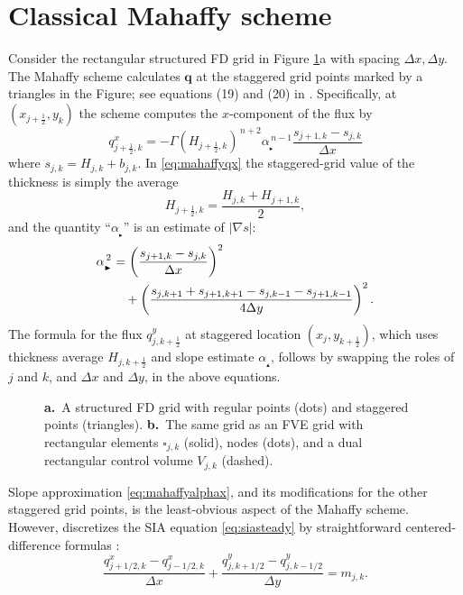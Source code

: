 \documentclass[twocolumn,letterpaper]{igs}
\newcommand\bq{\mathbf{q}}
\newcommand{\grad}{\nabla}
\newcommand\alpharight{\alpha_{{}_{\blacktriangleright}}}
\newcommand\alphaup{\alpha_{{\!}_{\blacktriangle}}}
\newcommand{\half}{\tfrac{1}{2}}
\begin{document}
\section{Classical Mahaffy scheme}   \label{sec:mahaffyfd}

Consider the rectangular structured FD grid in Figure \ref{fig:fdfemgrids}a with spacing $\Delta x,\Delta y$.  The Mahaffy scheme calculates $\bq$ at the staggered grid points marked by a triangles in the Figure; see equations (19) and (20) in \cite{Mahaffy1976}.  Specifically, at $(x_{j+\half},y_k)$ the scheme computes the $x$-component of the flux by
\begin{equation}
q^x_{j+\half,k} = - \Gamma (H_{j+\half,k})^{\,n+2} \alpharight^{\,n-1} \frac{s_{j+1,k} - s_{j,k}}{\Delta x}  \label{eq:mahaffyqx}
\end{equation}
where $s_{j,k} = H_{j,k} + b_{j,k}$.  In \eqref{eq:mahaffyqx} the staggered-grid value of the thickness is simply the average
\begin{equation}
  H_{j+\half,k} = \frac{H_{j,k} + H_{j+1,k}}{2},  \label{eq:mahaffyHav}
\end{equation}
and the quantity ``$\alpharight$\!'' is an estimate of $|\grad s|$:
\begin{align}
\alpharight^{\,2} &= \left(\frac{s_{j+1,k} - s_{j,k}}{\Delta x}\right)^2  \label{eq:mahaffyalphax} \\
  &\quad + \left(\frac{s_{j,k+1} + s_{j+1,k+1} - s_{j,k-1} - s_{j+1,k-1}}{4 \Delta y}\right)^2. \notag
\end{align}
The formula for the flux $q^y_{j,k+\half}$ at staggered location $(x_j,y_{k+\half})$, which uses thickness average $H_{j,k+\half}$ and slope estimate $\alphaup$, follows by swapping the roles of $j$ and $k$, and $\Delta x$ and $\Delta y$, in the above equations.

\begin{figure}[ht]
\begin{center}
 \quad 
\end{center}
\caption{\textbf{a.}~A structured FD grid with regular points (dots) and staggered points (triangles).  \textbf{b.}~The same grid as an FVE grid with rectangular elements $\square_{j,k}$ (solid), nodes (dots), and a dual rectangular control volume $V_{j,k}$ (dashed).}
\label{fig:fdfemgrids}
\end{figure}

Slope approximation \eqref{eq:mahaffyalphax}, and its modifications for the other staggered grid points, is the least-obvious aspect of the Mahaffy scheme.  However, \cite{Mahaffy1976} discretizes the SIA equation \eqref{eq:siasteady} by straightforward centered-difference formulas \citep{MortonMayers2005}:
\begin{equation}
\frac{q^x_{j+1/2,k} - q^x_{j-1/2,k}}{\Delta x} + \frac{q^y_{j,k+1/2}- q^y_{j,k-1/2}}{\Delta y} = m_{j,k}.  \label{eq:siasteadyfd}
\end{equation}
\end{document}
